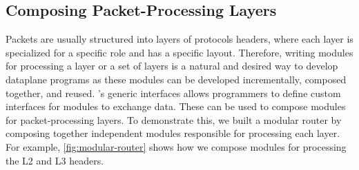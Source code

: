 \documentclass[letterpaper,twocolumn,10pt]{article}
\begin{document}
\subsection{Composing Packet-Processing Layers}
\label{subsection:composing-packet-processing-layers}
Packets are usually structured into layers of protocols headers, where
each layer is specialized for a specific role and has a specific
layout. Therefore, writing modules for processing a layer or a set of
layers is a natural and desired way to develop dataplane programs as
these modules can be developed incrementally, composed together, and
reused.
\uarch's generic interfaces allows programmers to define custom
interfaces for modules to exchange data. These can be used to compose
\ulang modules for packet-processing layers. To demonstrate this, we
built a modular router by composing together independent modules
responsible for processing each layer. For example,
\cref{fig:modular-router} shows how we compose modules for processing
the L2 and L3 headers.
\end{document}
